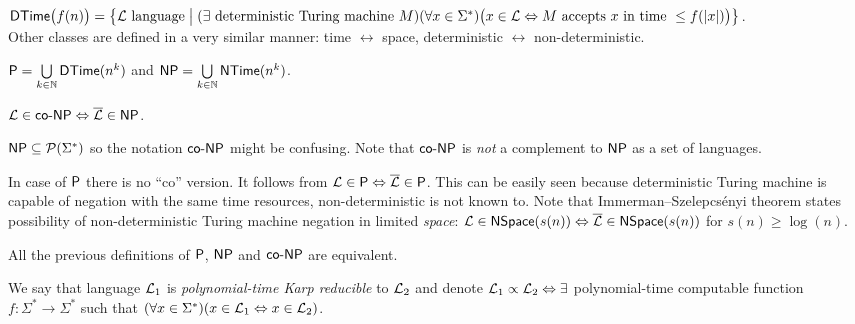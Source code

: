 		\begin{defn}\label{def:DTime}
			$\DTime\bigl(f(n)\bigr) = \bigl\{ {\cal L}\textnormal{ language} \bigm| (\exists \textnormal{ deterministic Turing machine }M)\\ (\forall x\in\Sigma^*)\bigl(x\in{\cal L} \iff M\textnormal{ accepts }x\textnormal{ in time }\leq f(|x|)\bigr) \bigr\}$.\\
			Other classes are defined in a very similar manner: time $\leftrightarrow$ space, deterministic $\leftrightarrow$ non-deterministic.
		\end{defn}
		
		\begin{defn}
			$\P = \bigcup\limits_{k\in\N} \DTime(n^k)$ and $\NP = \bigcup\limits_{k\in\N} \NTime(n^k)$.
		\end{defn}
		
		\begin{defn}
			$ {\cal L} \in \coNP \iff {\cal\overline L} \in \NP $.
		\end{defn}
		
		\begin{note}
			$\NP\subseteq\powerset{\Sigma^*}$ so the notation $\coNP$ might be confusing. Note that $\coNP$ is {\em not} a complement to $\NP$ as a set of languages.
		\end{note}
		
		\begin{remark}
			In case of $\P$ there is no ``co'' version. It follows from ${\cal L} \in \P \iff \overline{\cal L} \in \P$. This can be easily seen because deterministic Turing machine is capable of negation with the same time resources, non-deterministic is not known to. Note that Immerman--Szelepcsényi theorem states possibility of non-deterministic Turing machine negation in limited {\em space}: ${\cal L} \in \NSpace(s(n)) \iff \overline{\cal L} \in \NSpace(s(n))$ for $s(n) \geq \log(n)$.   %
		\end{remark}
		
		\begin{thm}
			All the previous definitions of $\P$, $\NP$ and $\coNP$ are equivalent.
		\end{thm}
		
		\begin{defn}
			We say that language ${\cal L}_1$ is {\em polynomial-time Karp reducible} to ${\cal L}_2$ and denote ${\cal L}_1\propto{\cal L}_2 \iff \exists$ polynomial-time computable function $f:\Sigma^*\rightarrow\Sigma^*$ such that $(\forall x\in\Sigma^*)(x\in{\cal L}_1\iff x\in{\cal L}_2)$.
		\end{defn}
		
